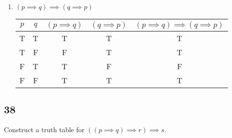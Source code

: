 \documentclass{article}
\begin{document}
\begin{enumerate}[label = \boldalph]
	\item $ \left( p \implies q \right) \implies \left( q \implies p \right) $ \\
	      \begin{tabular}{ | c | c | c | c | c | }
		      $ p $ & $ q $ & $ \left( p \implies q \right) $ & $ \left( q \implies p \right) $ & $ \left( p \implies q \right) \implies \left( q \implies p \right) $ \\
		      \hline
		      T     & T     & T                               & T                               & T                                                                    \\
		      T     & F     & F                               & T                               & T                                                                    \\
		      F     & T     & T                               & F                               & F                                                                    \\
		      F     & F     & T                               & T                               & T                                                                    \\
	      \end{tabular}

\end{enumerate}

\subsection{38}

Construct a truth table for $ \left( \left( p \implies q \right) \implies r \right) \implies s $.
\end{document}
